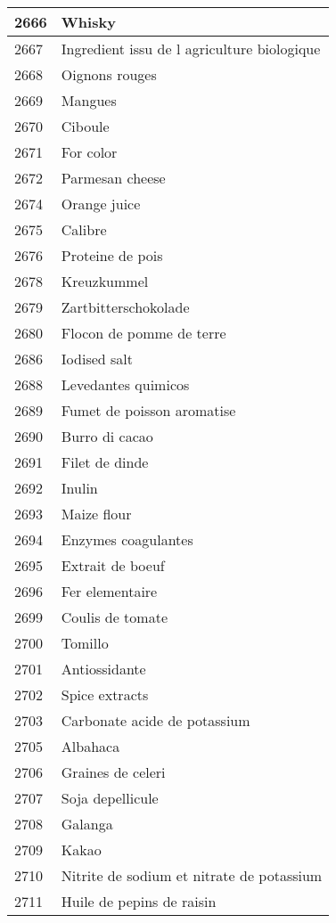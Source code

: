 \begin{longtable}{|l|l|}
2666 & Whisky \\ \hline 
2667 & Ingredient issu de l agriculture biologique \\ \hline 
2668 & Oignons rouges \\ \hline 
2669 & Mangues \\ \hline 
2670 & Ciboule \\ \hline 
2671 & For color \\ \hline 
2672 & Parmesan cheese \\ \hline 
2674 & Orange juice \\ \hline 
2675 & Calibre \\ \hline 
2676 & Proteine de pois \\ \hline 
2678 & Kreuzkummel \\ \hline 
2679 & Zartbitterschokolade \\ \hline 
2680 & Flocon de pomme de terre \\ \hline 
2686 & Iodised salt \\ \hline 
2688 & Levedantes quimicos \\ \hline 
2689 & Fumet de poisson aromatise \\ \hline 
2690 & Burro di cacao \\ \hline 
2691 & Filet de dinde \\ \hline 
2692 & Inulin \\ \hline 
2693 & Maize flour \\ \hline 
2694 & Enzymes coagulantes \\ \hline 
2695 & Extrait de boeuf \\ \hline 
2696 & Fer elementaire \\ \hline 
2699 & Coulis de tomate \\ \hline 
2700 & Tomillo \\ \hline 
2701 & Antiossidante \\ \hline 
2702 & Spice extracts \\ \hline 
2703 & Carbonate acide de potassium \\ \hline 
2705 & Albahaca \\ \hline 
2706 & Graines de celeri \\ \hline 
2707 & Soja depellicule \\ \hline 
2708 & Galanga \\ \hline 
2709 & Kakao \\ \hline 
2710 & Nitrite de sodium et nitrate de potassium \\ \hline 
2711 & Huile de pepins de raisin \\ \hline 

\end{longtable}
